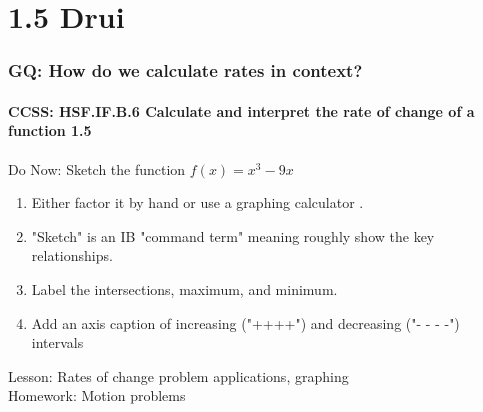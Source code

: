 \documentclass{beamer}
\begin{document}
  \section{1.5 Drui}
  \frame
  {
    \frametitle{GQ: How do we calculate rates in context?}
    \framesubtitle{CCSS: HSF.IF.B.6 Calculate and interpret the rate of change of a function \qquad \alert{1.5}}

    \begin{block}{Do Now: Sketch the function $f(x)=x^3-9x$}
      \begin{enumerate}
      \item Either factor it by hand or use a graphing calculator .
      \item "Sketch" is an IB "command term" meaning roughly show the key relationships.
      \item Label the intersections, maximum, and minimum.
      \item Add an axis caption of increasing ("++++") and decreasing ("- - - -") intervals
      \end{enumerate}
   \end{block}
    Lesson: Rates of change problem applications, graphing\\%
    Homework: Motion problems
  }

  
\end{document}
